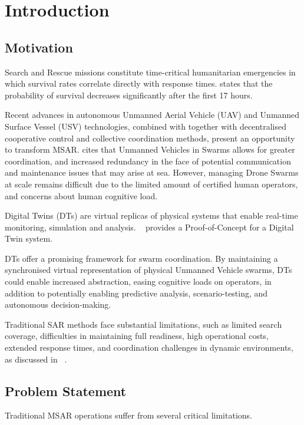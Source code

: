 \section{Introduction}\label{sec:introduction}
\subsection{Motivation}\label{subsec:motivation}
Search and Rescue missions constitute time-critical humanitarian emergencies in which survival rates correlate directly with response times.
\cite{doi:10.1580/06-WEME-OR-035R1.1} states that the probability of survival decreases significantly after the first 17 hours.

Recent advances in autonomous Unmanned Aerial Vehicle (UAV) and Unmanned Surface Vessel (USV) technologies, combined with together with decentralised cooperative control and collective coordination methods, present an opportunity to transform MSAR\@.
\cite{MESHCHERYAKOV201914} cites that Unmanned Vehicles in Swarms allows for greater coordination, and increased redundancy in the face of potential communication and maintenance issues that may arise at sea.
However, managing Drone Swarms at scale remains difficult due to the limited amount of certified human operators, and concerns about human cognitive load.

Digital Twins (DTs) are virtual replicas of physical systems that enable real-time monitoring, simulation and analysis.
~\cite{HAAG201864} provides a Proof-of-Concept for a Digital Twin system.

DTs offer a promising framework for swarm coordination.
By maintaining a synchronised virtual representation of physical Unmanned Vehicle swarms, DTs could enable increased abstraction, easing cognitive loads on operators, in addition to potentially enabling predictive analysis, scenario-testing, and autonomous decision-making.

Traditional SAR methods face substantial limitations, such as limited search coverage, difficulties in maintaining full readiness, high operational costs, extended response times, and coordination challenges in dynamic environments, as discussed in ~\cite{sar_challenges}.

\subsection{Problem Statement}\label{subsec:problem-statement}
Traditional MSAR operations suffer from several critical limitations.


